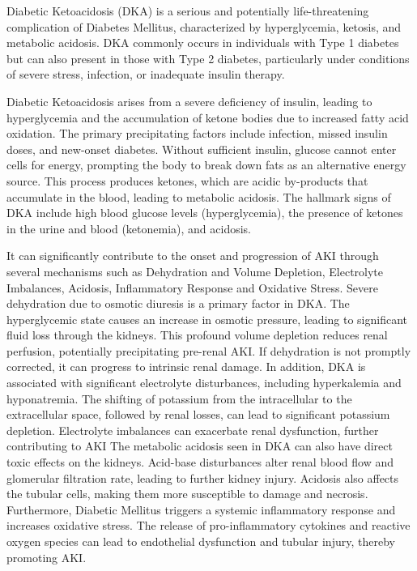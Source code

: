 \documentclass[../main.tex]{subfiles}
\begin{document}
Diabetic Ketoacidosis (DKA) is a serious and potentially life-threatening complication of Diabetes Mellitus, characterized by hyperglycemia, ketosis, and metabolic acidosis. 
DKA commonly occurs in individuals with Type 1 diabetes but can also present in those with Type 2 diabetes, particularly under conditions of severe stress, infection, or inadequate insulin therapy. 

Diabetic Ketoacidosis arises from a severe deficiency of insulin, leading to hyperglycemia and the accumulation of ketone bodies due to increased fatty acid oxidation. 
The primary precipitating factors include infection, missed insulin doses, and new-onset diabetes. 
Without sufficient insulin, glucose cannot enter cells for energy, prompting the body to break down fats as an alternative energy source. 
This process produces ketones, which are acidic by-products that accumulate in the blood, leading to metabolic acidosis. 
The hallmark signs of DKA include high blood glucose levels (hyperglycemia), the presence of ketones in the urine and blood (ketonemia), and acidosis.

It can significantly contribute to the onset and progression of AKI through several mechanisms such as Dehydration and Volume Depletion, Electrolyte Imbalances, Acidosis, Inflammatory Response and Oxidative Stress. 
Severe dehydration due to osmotic diuresis is a primary factor in DKA. 
The hyperglycemic state causes an increase in osmotic pressure, leading to significant fluid loss through the kidneys. 
This profound volume depletion reduces renal perfusion, potentially precipitating pre-renal AKI. 
If dehydration is not promptly corrected, it can progress to intrinsic renal damage.
In addition, DKA is associated with significant electrolyte disturbances, including hyperkalemia and hyponatremia. 
The shifting of potassium from the intracellular to the extracellular space, followed by renal losses, can lead to significant potassium depletion. 
Electrolyte imbalances can exacerbate renal dysfunction, further contributing to AKI
The metabolic acidosis seen in DKA can also have direct toxic effects on the kidneys. 
Acid-base disturbances alter renal blood flow and glomerular filtration rate, leading to further kidney injury. 
Acidosis also affects the tubular cells, making them more susceptible to damage and necrosis.
Furthermore, Diabetic Mellitus triggers a systemic inflammatory response and increases oxidative stress. 
The release of pro-inflammatory cytokines and reactive oxygen species can lead to endothelial dysfunction and tubular injury, thereby promoting AKI.
\end{document}

